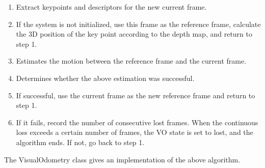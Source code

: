 \begin{mdframed}
\begin{enumerate}
\item Extract keypoints and descriptors for the new current frame.
\item If the system is not initialized, use this frame as the reference frame, calculate the 3D position of the key point according to the depth map, and return to step 1.
\item Estimates the motion between the reference frame and the current frame.
\item Determines whether the above estimation was successful.
\item If successful, use the current frame as the new reference frame and return to step 1.
\item If it fails, record the number of consecutive lost frames. When the continuous loss exceeds a certain number of frames, the VO state is set to lost, and the algorithm ends. If not, go back to step 1.
\end{enumerate}
\end{mdframed}

The VisualOdometry class gives an implementation of the above algorithm.

